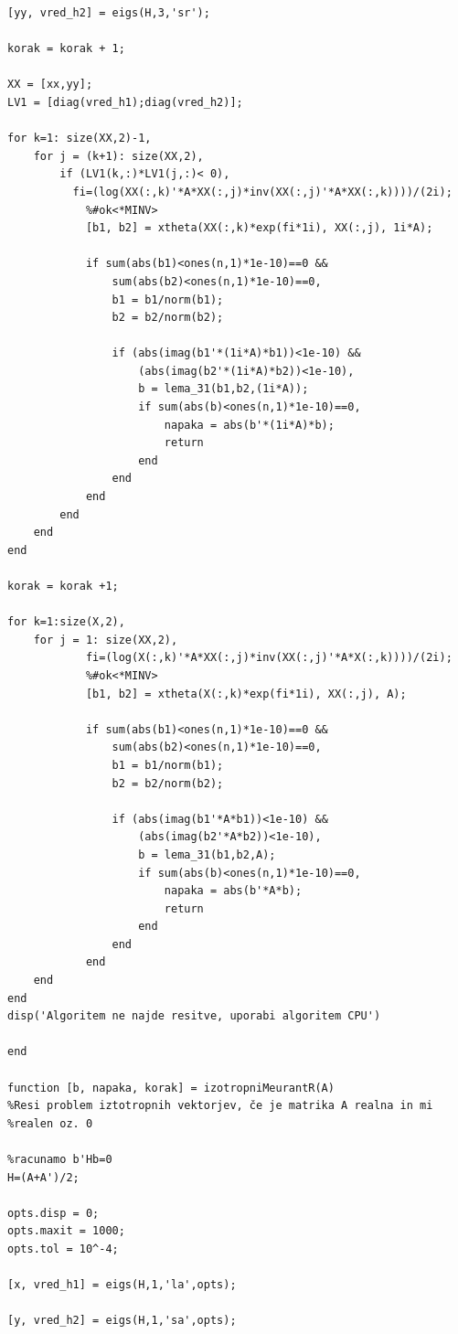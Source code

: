 \documentclass[12pt,a4paper]{amsart}
\theoremstyle{definition}
\theoremstyle{plain}
\begin{document}
\begin{verbatim}
[yy, vred_h2] = eigs(H,3,'sr'); 

korak = korak + 1;

XX = [xx,yy];
LV1 = [diag(vred_h1);diag(vred_h2)];

for k=1: size(XX,2)-1,
    for j = (k+1): size(XX,2),
        if (LV1(k,:)*LV1(j,:)< 0),
          fi=(log(XX(:,k)'*A*XX(:,j)*inv(XX(:,j)'*A*XX(:,k))))/(2i);
            %#ok<*MINV>
            [b1, b2] = xtheta(XX(:,k)*exp(fi*1i), XX(:,j), 1i*A);

            if sum(abs(b1)<ones(n,1)*1e-10)==0 && 
                sum(abs(b2)<ones(n,1)*1e-10)==0,
                b1 = b1/norm(b1);
                b2 = b2/norm(b2);

                if (abs(imag(b1'*(1i*A)*b1))<1e-10) && 
                    (abs(imag(b2'*(1i*A)*b2))<1e-10),
                    b = lema_31(b1,b2,(1i*A));
                    if sum(abs(b)<ones(n,1)*1e-10)==0,
                        napaka = abs(b'*(1i*A)*b);
                        return
                    end
                end
            end
        end
    end
end

korak = korak +1;

for k=1:size(X,2),
    for j = 1: size(XX,2),
            fi=(log(X(:,k)'*A*XX(:,j)*inv(XX(:,j)'*A*X(:,k))))/(2i);
            %#ok<*MINV>
            [b1, b2] = xtheta(X(:,k)*exp(fi*1i), XX(:,j), A);

            if sum(abs(b1)<ones(n,1)*1e-10)==0 && 
                sum(abs(b2)<ones(n,1)*1e-10)==0,
                b1 = b1/norm(b1);
                b2 = b2/norm(b2);

                if (abs(imag(b1'*A*b1))<1e-10) &&
                    (abs(imag(b2'*A*b2))<1e-10),
                    b = lema_31(b1,b2,A);
                    if sum(abs(b)<ones(n,1)*1e-10)==0,
                        napaka = abs(b'*A*b);
                        return
                    end
                end
            end
    end
end        
disp('Algoritem ne najde resitve, uporabi algoritem CPU')

end

function [b, napaka, korak] = izotropniMeurantR(A)
%Resi problem iztotropnih vektorjev, če je matrika A realna in mi 
%realen oz. 0

%racunamo b'Hb=0
H=(A+A')/2;

opts.disp = 0; 
opts.maxit = 1000; 
opts.tol = 10^-4;

[x, vred_h1] = eigs(H,1,'la',opts); 

[y, vred_h2] = eigs(H,1,'sa',opts); 


\end{verbatim}
\end{document}
